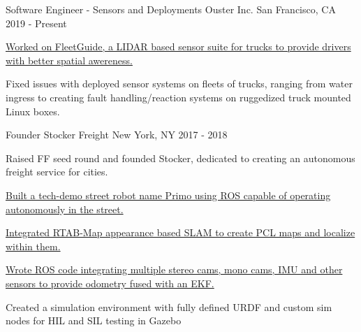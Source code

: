 

\begin{cventries}

  \cventry
    {Software Engineer - Sensors and Deployments} %
    {Ouster Inc.} %
    {San Francisco, CA} %
    {2019 - Present} %
    {
      \begin{cvitems} %
        \item {\href{https://www.fleetguide.io/}
                {Worked on FleetGuide, a LIDAR based sensor suite for trucks to provide drivers with better spatial awereness.}}
        \item {Fixed issues with deployed sensor systems on fleets of trucks, ranging from water ingress to creating fault handling/reaction
        systems on ruggedized truck mounted Linux boxes.}
      \end{cvitems}
    }

  \cventry
    {Founder} %
    {Stocker Freight} %
    {New York, NY} %
    {2017 - 2018} %
    {
      \begin{cvitems} %
        \item {Raised FF seed round and founded Stocker, dedicated to creating an autonomous freight service for cities.}
        \item {\href{http://bit.ly/2T3Kvvs}
            {Built a tech-demo street robot name Primo using ROS capable of operating autonomously in the street.}}
        \item {\href{http://bit.ly/2TjikYy}
            {Integrated RTAB-Map appearance based SLAM to create PCL maps and localize within them.}}
        \item {\href{http://bit.ly/2T3d4sU}
            {Wrote ROS code integrating multiple stereo cams, mono cams, IMU and other sensors to provide odometry fused with an EKF.}}
        \item {Created a simulation environment with fully defined URDF and custom sim nodes for HIL and SIL testing in Gazebo}
      \end{cvitems}
    }


\end{cventries}
